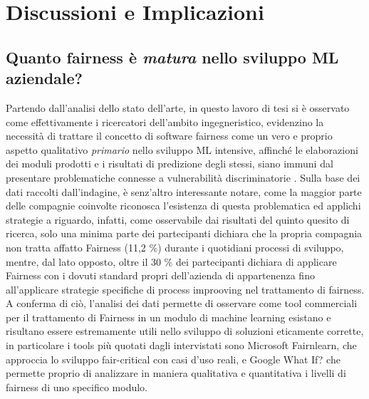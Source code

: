     
    
    \section{Discussioni e Implicazioni}
    
    \subsection{Quanto fairness è \emph{matura} nello sviluppo ML aziendale?}
    Partendo dall'analisi dello stato dell'arte, in questo lavoro di tesi si è osservato come effettivamente i ricercatori dell'ambito ingegneristico, evidenzino la necessità di trattare il concetto di software fairness come un vero e proprio aspetto qualitativo \emph{primario} nello sviluppo ML intensive, affinché le elaborazioni dei moduli prodotti e i risultati di predizione degli stessi, siano immuni dal presentare problematiche connesse a vulnerabilità discriminatorie \cite{brun2018software}. Sulla base dei dati raccolti dall'indagine, è senz'altro interessante notare, come la maggior parte delle compagnie coinvolte riconosca l'esistenza di questa problematica ed applichi strategie a riguardo, infatti, come osservabile  dai risultati del quinto quesito di ricerca, solo una minima parte dei partecipanti dichiara che la propria compagnia non tratta affatto Fairness (11,2 \%) durante i quotidiani processi di sviluppo, mentre, dal lato opposto, oltre il 30 \% dei partecipanti dichiara di 
    applicare Fairness con i dovuti standard propri dell'azienda di appartenenza fino all'applicare strategie specifiche di process improoving nel trattamento di fairness. A conferma di ciò, l'analisi dei dati permette di osservare come tool commerciali per il trattamento di Fairness in un modulo di machine learning esistano e risultano essere estremamente utili nello sviluppo di soluzioni eticamente corrette, in particolare i tools più quotati dagli intervistati sono  Microsoft Fairnlearn, che approccia lo sviluppo fair-critical con casi d'uso reali, e Google What If? che permette proprio di analizzare in maniera qualitativa e quantitativa i livelli di fairness di uno specifico modulo.\\
    
    
